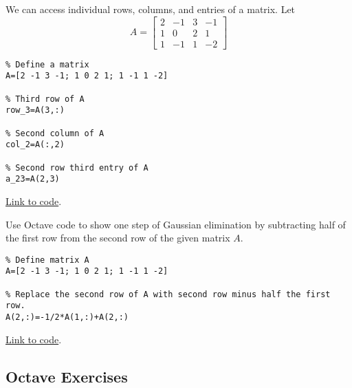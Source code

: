 \documentclass{ximera}
\begin{document}
\begin{template}\label{temp:matrixRowColEntry}
    We can access individual rows, columns, and entries of a matrix.  Let $$A=\begin{bmatrix}2 & -1 & 3 & -1\\1 & 0 & 2 & 1\\1 & -1 & 1 & -2\end{bmatrix}$$
\begin{verbatim}
% Define a matrix 
A=[2 -1 3 -1; 1 0 2 1; 1 -1 1 -2]

% Third row of A
row_3=A(3,:)

% Second column of A
col_2=A(:,2)

% Second row third entry of A
a_23=A(2,3)   
\end{verbatim}
\href{https://sagecell.sagemath.org/?z=eJxVjEEKwjAURPeB3GE2BQsR7M-u0kXAG9SdSAhtigGbQIhYb-9v7cbNMDM8XoWLn0L0cJhdyWGBFKa7EY4NNMcZDU4gbIU_DrpLIUWF6yPkETm9kSYYKbhZ3ZmDVm39I3o_pDhiSM_XHHeKhyWmWkX_1Coqm9LHkj877iytTlK6_gIqSCuZ&lang=octave&interacts=eJyLjgUAARUAuQ==}{Link to code}.
\end{template}

\begin{example}\label{ex:gauss_octave}
Use Octave code to show one step of Gaussian elimination by subtracting half of the first row from the second row of the given matrix $A$.
\begin{explanation}
\begin{verbatim}
% Define matrix A
A=[2 -1 3 -1; 1 0 2 1; 1 -1 1 -2] 

% Replace the second row of A with second row minus half the first row.  
A(2,:)=-1/2*A(1,:)+A(2,:)  
\end{verbatim}

\href{https://sagecell.sagemath.org/?z=eJxNjMsKwjAURPeB_MNsCvVRNXGndHHBL3ArLkK9IYE2kSRSP99YN26Gw5lhGlzY-sCYTEn-DZKC-ptGp3CscYbCARoLVFdD3yGFFA2u_BzNwCiOkXmI4YEUZ0QLwuyL-5eTD68MZ0a7zK1PuXyLHeoZtXp7WvWd2us1tary5qc-770qUw==&lang=octave&interacts=eJyLjgUAARUAuQ==}{Link to code}.
\end{explanation}
\end{example}


\subsection*{Octave Exercises}
\end{document}
